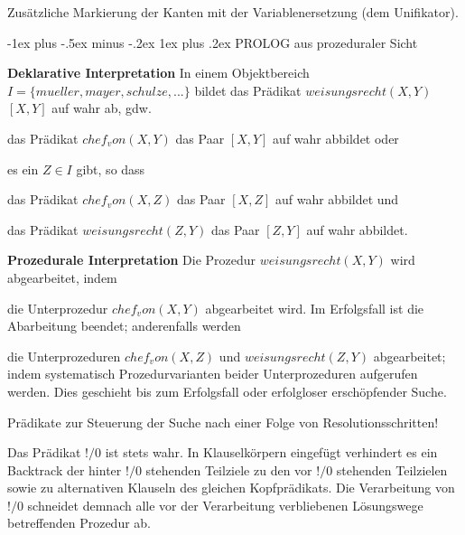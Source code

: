 \documentclass[a4paper]{article}
\makeatletter
\renewcommand{\note}[2]{\begin{noteBox} \textbf{#1} #2 \end{noteBox}}
\renewcommand{\subsubsection}{\@startsection{subsubsection}{3}{0mm}%
                {-1ex plus -.5ex minus -.2ex}%
                {1ex plus .2ex}%
                {\normalfont\small\bfseries}}
\makeatother
\begin{document}
\begin{multicols}{3}
  Zusätzliche Markierung der Kanten mit der Variablenersetzung (dem Unifikator).


  \subsubsection{PROLOG aus prozeduraler Sicht}
  \note{Deklarative Interpretation}{In einem Objektbereich $I=\{mueller, mayer, schulze, ...\}$ bildet das Prädikat $weisungsrecht(X,Y)$ $[X,Y]$ auf wahr ab, gdw.
    \begin{itemize*}
      \item das Prädikat $chef_von(X,Y)$ das Paar $[X,Y]$ auf wahr abbildet oder
      \item es ein $Z\in I$ gibt, so dass
      \begin{itemize*}
        \item das Prädikat $chef_von(X,Z)$ das Paar $[X,Z]$ auf wahr abbildet und
        \item das Prädikat $weisungsrecht(Z,Y)$ das Paar $[Z,Y]$ auf wahr abbildet.
      \end{itemize*}
    \end{itemize*}
  }

  \note{Prozedurale Interpretation}{Die Prozedur $weisungsrecht(X,Y)$ wird abgearbeitet, indem
    \begin{enumerate*}
      \item die Unterprozedur $chef_von(X,Y)$ abgearbeitet wird. Im Erfolgsfall ist die Abarbeitung beendet; anderenfalls werden
      \item die Unterprozeduren $chef_von(X,Z)$ und $weisungsrecht(Z,Y)$ abgearbeitet; indem systematisch Prozedurvarianten beider Unterprozeduren aufgerufen werden. Dies geschieht bis zum Erfolgsfall oder erfolgloser erschöpfender Suche.
    \end{enumerate*}
  }

  Prädikate zur Steuerung der Suche nach einer Folge von Resolutionsschritten!

  Das Prädikat $!/0$ ist stets wahr. In Klauselkörpern eingefügt verhindert es ein Backtrack der hinter $!/0$ stehenden Teilziele zu den vor $!/0$ stehenden Teilzielen sowie zu alternativen Klauseln des gleichen Kopfprädikats. Die Verarbeitung von $!/0$ schneidet demnach alle vor der Verarbeitung verbliebenen Lösungswege betreffenden Prozedur ab.


\end{multicols}
\end{document}
